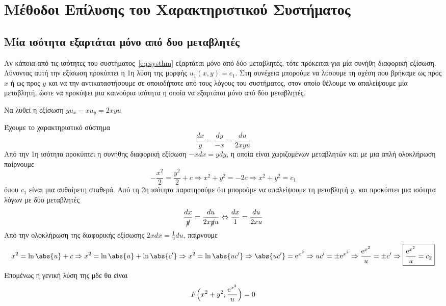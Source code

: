 \section{Μέθοδοι Επίλυσης του Χαρακτηριστικού Συστήματος}

\subsection{Μία ισότητα εξαρτάται μόνο από δυο μεταβλητές}

Αν κάποια από τις ισότητες του συστήματος~\eqref{eq:systhm} εξαρτάται μόνο από 
δύο μεταβλητές, τότε πρόκειται για μία συνήθη διαφορική εξίσωση.
Λύνοντας αυτή την εξίσωση προκύπτει η 1η λύση της μορφής $ u_{1}(x,y)= c_{1} $. 
Στη συνέχεια μπορούμε να λύσουμε τη σχέση που βρήκαμε ως προς $x$ ή ως προς $y$ και 
να την αντικαταστήσουμε σε οποιοδήποτε από τους λόγους του συστήματος, στον οποίο 
θέλουμε να απαλείψουμε μία μεταβλητή, ώστε να προκύψει μια καινούρια ισότητα 
η οποία να  εξαρτάται μόνο από δύο μεταβλητές.

\begin{example}
  Να λυθεί η εξίσωση $ yu_{x}-xu_{y}=2xyu $  
\end{example}
\begin{solution}
  Έχουμε το χαρακτηριστικό σύστημα
  \[
    \frac{dx}{y} = \frac{dy}{-x} = \frac{du}{2xyu} 
  \] 
  Από την 1η ισότητα προκύπτει η συνήθης διαφορική εξίσωση $ -x dx = y dy $, η 
  οποία είναι χωριζομένων μεταβλητών και με μια απλή ολοκλήρωση παίρνουμε 
  \[
    - \frac{x^{2}}{2} = \frac{y^{2}}{2} + c \Rightarrow x^{2}+y^{2}=-2c \Rightarrow
    \boxed{x^{2}+y^{2}= c_{1}}
  \] 
  όπου $ c_{1} $ είναι μια αυθαίρετη σταθερά. Από τη 2η ισότητα παρατηρούμε ότι 
  μπορούμε να απαλείψουμε τη μεταβλητή $y$, και προκύπτει μια ισότητα λόγων με δύο 
  μεταβλητές
  \[
    \frac{dx}{\cancel{y}} = \frac{du}{2x\cancel{y}u} \Leftrightarrow \frac{dx}{1} =
    \frac{du}{2xu} 
  \] 
  Από την ολοκλήρωση της διαφορικής εξίσωσης $2x dx = \frac{1}{u} du$, παίρνουμε
  \[
    x^{2}= \ln{\abs{u}} + c \Rightarrow x^{2}= \ln{\abs{u}} + \ln{\abs{c'}}
    \Rightarrow x^{2}= \ln{\abs{uc'}} \Rightarrow \abs{uc'} = \mathrm{e}^{x^{2}} 
    \Rightarrow uc' = \pm \mathrm{e}^{x^{2}} 
    \Rightarrow \frac{\mathrm{e}^{x^{2}}}{u} = \pm c' \Rightarrow
    \boxed{\frac{\mathrm{e}^{x^{2}}}{u} = c_{2}}
  \] 
  Επομένως η γενική λύση της μδε θα είναι 
  \[
    F\Bigl(x^{2}+y^{2}, \frac{\mathrm{e}^{x^{2}}}{u}\Bigr) = 0
  \] 
\end{solution}



